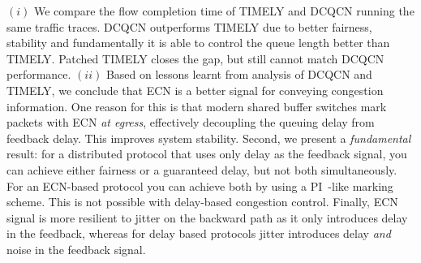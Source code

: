  $(i)$ We compare the flow completion time of TIMELY and 
DCQCN running the same traffic traces. DCQCN outperforms TIMELY
due to better fairness, stability and fundamentally it is able to
control the queue length better than TIMELY. Patched TIMELY closes the gap, but 
still cannot match DCQCN performance.
$(ii)$ Based on lessons learnt from analysis of DCQCN and TIMELY,
we conclude that ECN is a better signal for conveying congestion information.
One reason for this is that modern shared buffer switches mark packets with ECN
{\em at egress}, effectively decoupling the queuing delay from feedback delay.
This improves system stability. Second, we present a \emph{fundamental} result:
for a distributed protocol that uses only delay as the feedback signal, you can
achieve either fairness or a guaranteed delay, but not both simultaneously. For
an ECN-based protocol you can achieve both by using a
PI~\cite{hollot2001designing}-like marking scheme. This is not possible with
delay-based congestion control. Finally, ECN signal is more resilient to 
jitter on the backward path as it only introduces delay in the
feedback, whereas for delay based protocols jitter introduces delay
\emph{and} noise in the feedback signal.



